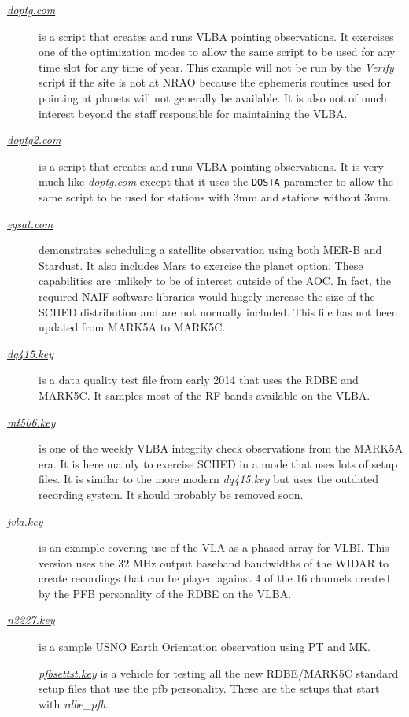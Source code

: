 \documentclass{report}
\begin{document}
\begin{description}
\item[
{\href{examples/doptg.com}{{\sl doptg.com}}}] is a
script that creates and runs VLBA pointing observations.  It exercises
one of the optimization modes to allow the same script to be used for
any time slot for any time of year.  This example will not be run by
the {\sl Verify} script if the site is not at NRAO because the
ephemeris routines used for pointing at planets will not generally be
available.  It is also not of much interest beyond the staff
responsible for maintaining the VLBA.

\item[
{\href{examples/doptg2.com}{{\sl doptg2.com}}}] is a
script that creates and runs VLBA pointing observations.  It is very
much like {\sl doptg.com} except that it uses the 
{\hyperref[MP:DOSTA]{{\tt DOSTA}}}
parameter to allow the same script to be used for stations
with 3mm and stations without 3mm.

\item[
{\href{examples/egsat.key}{{\sl egsat.com}}}]
demonstrates scheduling a satellite observation using both MER-B and
Stardust.  It also includes Mars to exercise the planet option.  These
capabilities are unlikely to be of interest outside of the AOC.  In
fact, the required NAIF software libraries would hugely increase the
size of the SCHED distribution and are not normally included.  This
file has not been updated from MARK5A to MARK5C.

\item[
{\href{examples/dq415.key}{{\sl dq415.key}}}] is
a data quality test file from early 2014 that uses the RDBE and MARK5C.
It samples most of the RF bands available on the VLBA.

\item[
{\href{examples/mt506.key}{{\sl mt506.key}}}] is one
of the weekly VLBA integrity check observations from the MARK5A era.
It is here mainly to exercise SCHED in a mode that uses lots of setup
files.  It is similar to the more modern {\sl dq415.key} but uses the
outdated recording system.  It should probably be removed soon.

\item[
{\href{examples/jvla.key}{{\sl jvla.key}}}] is
an example covering use of the VLA as a phased array for VLBI.  This
version uses the 32 MHz output baseband bandwidths of the WIDAR to
create recordings that can be played against 4 of the 16 channels
created by the PFB personality of the RDBE on the VLBA.

\item[
{\href{examples/n2227.key}{{\sl n2227.key}}}] is a
sample USNO Earth Orientation observation using PT and MK.

{\href{examples/pfbsettst.key}{{\sl pfbsettst.key}}} is a
vehicle for testing all the new RDBE/MARK5C standard setup files that
use the pfb personality.  These are the setups that start with 
{\sl rdbe\_pfb}.


\end{description}
\end{document}
